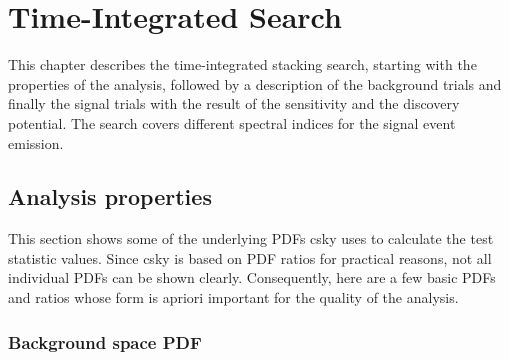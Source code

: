 \chapter{Time-Integrated Search} \label{sec:csky_time_int}

This chapter describes the time-integrated stacking search, starting with the properties of the analysis, followed by a description of the background trials and finally the signal trials with the result of the sensitivity and the discovery potential.
The search covers different spectral indices for the signal event emission.

\section{Analysis properties}

This section shows some of the underlying PDFs csky uses to calculate the test statistic values.
Since csky is based on PDF ratios for practical reasons, not all individual PDFs can be shown clearly.
Consequently, here are a few basic PDFs and ratios whose form is apriori important for the quality of the analysis.

\subsection{Background space PDF}

